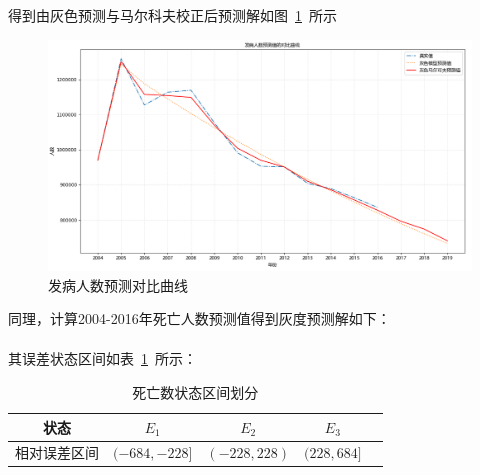 \documentclass{whutmod}
\begin{document}
	  得到由灰色预测与马尔科夫校正后预测解如图~\ref{afd}~所示
    \begin{figure}[H]
	\centering
	\includegraphics[width=\textwidth]{figures/f.png}
	\caption{发病人数预测对比曲线}\label{afd}
\end{figure}
	  同理，计算2004-2016年死亡人数预测值得到灰度预测解如下：
	  	  \begin{gather}

	  \end{gather}
	  
	  其误差状态区间如表~\ref{ss}~所示：
	    \begin{table}[H]
	  	\centering\caption{死亡数状态区间划分}\label{ss}
	  	\begin{tabular}{ccccc}
	  		\toprule[2pt]
	  		\multicolumn{1}{m{3cm}}{\centering 状态}
	  		& \multicolumn{1}{m{2cm}}{\centering $E_{1}$}
	  		& \multicolumn{1}{m{2cm}}{\centering $E_{2}$}
	  		& \multicolumn{1}{m{2cm}}{\centering $E_{3}$}
	  		\\
	  		\midrule[1pt]
	  		相对误差区间 &  $(-684,-228]$  &$(-228,228)$ & $(228,684]$   \\ 
	  		\bottomrule[2pt]	
	  	\end{tabular}
	  \end{table}
	  
\end{document}
